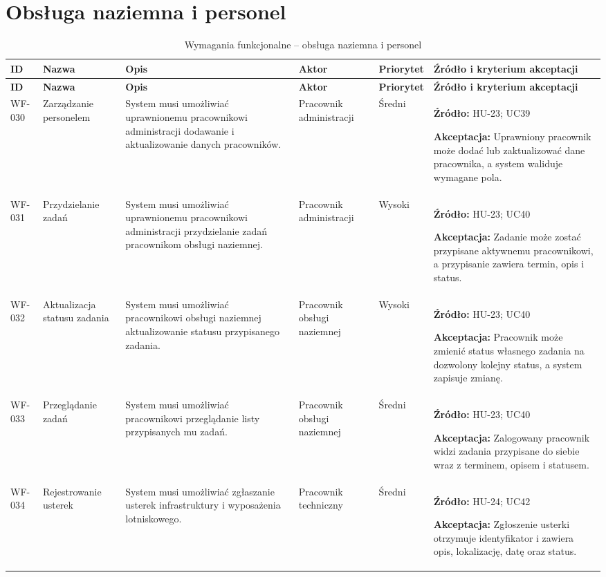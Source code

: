 \documentclass[12pt,a4paper,oneside]{report}
\begin{document}
\section{Obsługa naziemna i personel}
\small
\begin{longtable}{|p{1.05cm}|p{2.15cm}|p{3.35cm}|p{1.75cm}|p{0.95cm}|p{4.05cm}|}
\caption{Wymagania funkcjonalne -- obsługa naziemna i personel}\\\hline
\rowcolor{lightblue}\textbf{ID} & \textbf{Nazwa} & \textbf{Opis} & \textbf{Aktor} & \textbf{Priorytet} & \textbf{Źródło i kryterium akceptacji}\\\hline
\endfirsthead
\hline
\rowcolor{lightblue}\textbf{ID} & \textbf{Nazwa} & \textbf{Opis} & \textbf{Aktor} & \textbf{Priorytet} & \textbf{Źródło i kryterium akceptacji}\\\hline
\endhead
WF-030 & Zarządzanie personelem & System musi umożliwiać uprawnionemu pracownikowi administracji dodawanie i aktualizowanie danych pracowników. & Pracownik administracji & Średni & \textbf{Źródło:} HU-23; UC39\par\textbf{Akceptacja:} Uprawniony pracownik może dodać lub zaktualizować dane pracownika, a system waliduje wymagane pola.\\\hline
WF-031 & Przydzielanie zadań & System musi umożliwiać uprawnionemu pracownikowi administracji przydzielanie zadań pracownikom obsługi naziemnej. & Pracownik administracji & Wysoki & \textbf{Źródło:} HU-23; UC40\par\textbf{Akceptacja:} Zadanie może zostać przypisane aktywnemu pracownikowi, a przypisanie zawiera termin, opis i status.\\\hline
WF-032 & Aktualizacja statusu zadania & System musi umożliwiać pracownikowi obsługi naziemnej aktualizowanie statusu przypisanego zadania. & Pracownik obsługi naziemnej & Wysoki & \textbf{Źródło:} HU-23; UC40\par\textbf{Akceptacja:} Pracownik może zmienić status własnego zadania na dozwolony kolejny status, a system zapisuje zmianę.\\\hline
WF-033 & Przeglądanie zadań & System musi umożliwiać pracownikowi przeglądanie listy przypisanych mu zadań. & Pracownik obsługi naziemnej & Średni & \textbf{Źródło:} HU-23; UC40\par\textbf{Akceptacja:} Zalogowany pracownik widzi zadania przypisane do siebie wraz z terminem, opisem i statusem.\\\hline
WF-034 & Rejestrowanie usterek & System musi umożliwiać zgłaszanie usterek infrastruktury i wyposażenia lotniskowego. & Pracownik techniczny & Średni & \textbf{Źródło:} HU-24; UC42\par\textbf{Akceptacja:} Zgłoszenie usterki otrzymuje identyfikator i zawiera opis, lokalizację, datę oraz status.\\\hline

\end{longtable}
\end{document}
